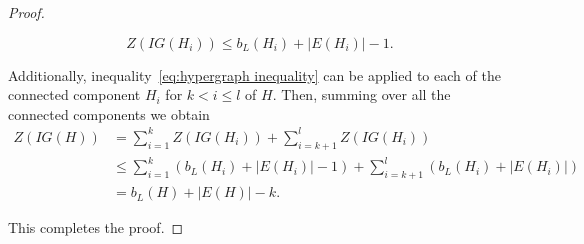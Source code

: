 \documentclass[10pt,a4paper]{amsart}
\begin{document}
\begin{proof}
\begin{description}
    \[Z(IG(H_i)) \leq b_L(H_i) + |E(H_i)| - 1.\]
    
    Additionally, inequality~\eqref{eq:hypergraph inequality} can be applied to each of the connected component $H_i$ for $k < i \leq l$ of $H$. Then, summing over all the connected components we obtain
    \begin{align*}
        Z(IG(H)) &= \sum_{i=1}^{k} Z(IG(H_i)) + \sum_{i=k+1}^l Z(IG(H_i)) \\
        &\leq \sum_{i=1}^{k} (b_L(H_i)+|E(H_i)|-1) + \sum_{i=k+1}^l (b_L(H_i)+|E(H_i)|) \\
        &= b_L(H) + |E(H)| - k.
 \end{align*} 
\end{description}
This completes the proof.
\end{proof}
\end{document}
